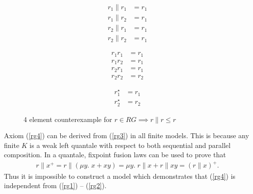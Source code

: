\documentclass{llncs}
\begin{document}
\begin{figure}[H]
\centering
\begin{subfigure}{0.24\textwidth}
\end{subfigure}
\begin{subfigure}{0.24\textwidth}
\begin{align*}
r_1 \| r_1 &= r_1\\
r_1 \| r_2 &= r_1\\
r_2 \| r_1 &= r_1\\
r_2 \| r_2 &= r_1
\end{align*}
\end{subfigure}
\begin{subfigure}{0.24\textwidth}
\begin{align*}
r_1r_1 &= r_1\\
r_1r_2 &= r_1\\
r_2r_1 &= r_1\\
r_2r_2 &= r_2
\end{align*}
\end{subfigure}
\begin{subfigure}{0.24\textwidth}
\begin{align*}
r_1^\star &= r_1\\
r_2^\star &= r_2
\end{align*}
\end{subfigure}
\caption{4 element counterexample for $r \in RG \implies r\|r \le r$}
\label{fig:rg1}
\end{figure}

Axiom (\ref{rg4}) can be derived from (\ref{rg3}) in all finite
models. This is because any finite $K$ is a weak left quantale with
respect to both sequential and parallel composition. In a quantale,
fixpoint fusion laws can be used to prove that
\begin{align*}
r\|x^+ = r\|(\mu y.\; x + xy) = \mu y.\; r\|x + r\|xy = (r\|x)^+.
\end{align*}
Thus it is impossible to construct a model which demonstrates
that (\ref{rg4}) is independent from (\ref{rg1}) -- (\ref{rg2}).
\end{document}
